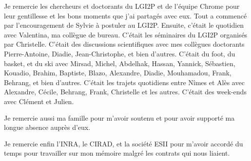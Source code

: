 Je remercie les chercheurs et doctorants du LGI2P et de l'équipe Chrome pour leur gentillesse et les bons moments que j'ai partagés avec eux. Tout a commencé par l'encouragement de Sylvie à postuler au LGI2P. Ensuite, c'était le quotidien avec Valentina, ma collègue de bureau. C'était les séminaires du LGI2P organisés par Christelle. C'était des discussions scientifiques avec mes collègues doctorants Pierre-Antoine, Diadie, Jean-Christophe, et bien d'autres. C'était du foot, du basket, et du ski avec Mirsad, Michel, Abdelhak, Hassan, Yannick, Sébastien, Kouadio, Brahim, Baptiste, Blazo, Alexandre, Diadie, Mouhamadou, Frank, Behrang, et bien d'autres. C'était les trajets quotidiens entre Nîmes et Alès avec Alexandre, Cécile, Behrang, Frank, Christelle et les autres. C'était des week-ends avec Clément et Julien. 

Je remercie aussi ma famille pour m'avoir soutenu et pour avoir supporté ma longue absence auprès d'eux. 

Je remercie enfin l'INRA, le CIRAD, et la société ESII pour m'avoir accordé du temps pour travailler sur mon mémoire malgré les contrats qui nous liaient.
